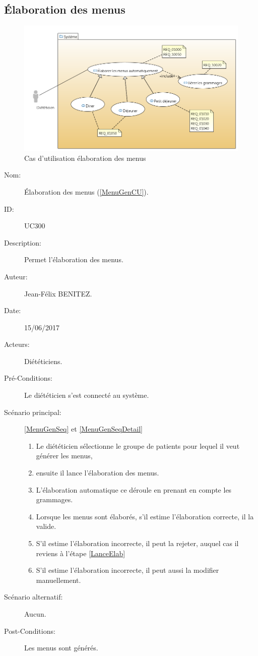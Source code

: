 \subsection{Élaboration des menus}
\begin{figure}
  \centering
      \includegraphics[width=1.00\textwidth]{../../CasDUtilisations/MenuGen/CasDUtilisation/MenuGen.png} %
\caption{Cas d'utilisation élaboration des menus}
\label{MenuGenCU}
\end{figure}

\begin{description}
\item[Nom:] Élaboration des menus (\autoref{MenuGenCU}).
\item[ID:] UC300
\item[Description:] Permet l'élaboration des menus.
\item[Auteur:] Jean-Félix BENITEZ.
\item[Date:] 15/06/2017
\item[Acteurs:] Diététiciens.
\item[Pré-Conditions:] Le diététicien s'est connecté au système.
\item[Scénario principal:] \autoref{MenuGenSeq} et \autoref{MenuGenSeqDetail}
  \begin{enumerate}
  \item Le diététicien sélectionne le groupe de patients pour lequel il veut générer les menus,
  \item \label{LanceElab}ensuite il lance l'élaboration des menus.
  \item L'élaboration automatique ce déroule en prenant en compte les grammages.
  \item Lorsque les menus sont élaborés, s'il estime l'élaboration correcte, il la valide.
  \item S'il estime l'élaboration incorrecte, il peut la rejeter, auquel cas il reviens à l'étape \ref{LanceElab}
  \item S'il estime l'élaboration incorrecte, il peut aussi la modifier manuellement.
  \end{enumerate}
\item[Scénario alternatif:] Aucun.
\item[Post-Conditions:] Les menus sont générés.
\end{description}

